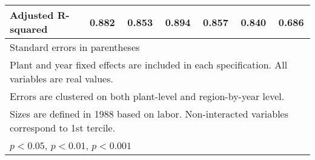 \begin{table}[htbp]
\begin{tabular}{l*{6}{c}}
Adjusted R-squared&    0.882         &    0.853         &    0.894         &    0.857         &    0.840         &    0.686         \\
\bottomrule
\multicolumn{7}{l}{\footnotesize Standard errors in parentheses}\\
\multicolumn{7}{l}{\footnotesize Plant and year fixed effects are included in each specification. All variables are real values.}\\
\multicolumn{7}{l}{\footnotesize Errors are clustered on both plant-level and region-by-year level.}\\
\multicolumn{7}{l}{\footnotesize Sizes are defined in 1988 based on labor. Non-interacted variables correspond to 1st tercile.}\\
\multicolumn{7}{l}{\footnotesize \sym{*} \(p<0.05\), \sym{**} \(p<0.01\), \sym{***} \(p<0.001\)}\\
\end{tabular}
\end{table}
